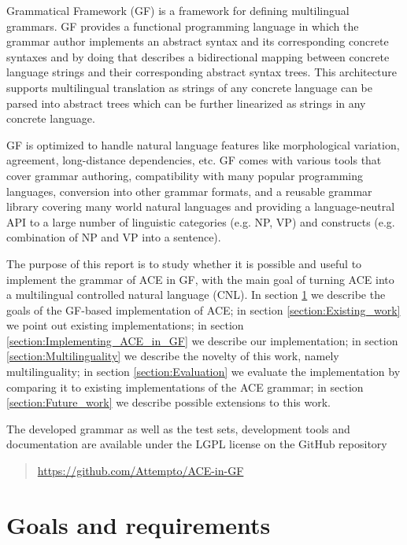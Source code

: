 \documentclass[a4paper]{article}
\begin{document}
Grammatical Framework (GF) \cite{ranta:book2011}
is a framework for defining multilingual grammars.
GF provides a functional programming language in which
the grammar author implements an abstract syntax and its corresponding
concrete syntaxes and by doing that
describes a bidirectional mapping between concrete language strings and
their corresponding abstract syntax trees. This architecture supports
multilingual translation as strings of any concrete language can be parsed into
abstract trees which can be further linearized as strings in any concrete
language.

GF is optimized to handle natural language features like morphological
variation, agreement, long-distance dependencies, etc.
GF comes with various tools that
cover grammar authoring, compatibility with many popular programming languages,
conversion into other grammar formats, and a reusable grammar library covering
many world natural languages and providing a language-neutral API to a large
number of linguistic categories (e.g. NP, VP) and constructs
(e.g. combination of NP and VP into a sentence).

The purpose of this report is to study whether it is possible and useful to
implement the grammar of ACE in GF, with the main goal of turning ACE into
a multilingual controlled natural language (CNL).
In section \ref{section:Goals_and_requirements} we describe the goals of the
GF-based implementation of ACE;
in section \ref{section:Existing_work} we point out existing implementations;
in section \ref{section:Implementing_ACE_in_GF} we describe our implementation;
in section \ref{section:Multilinguality} we describe the novelty of this work,
namely multilinguality;
in section \ref{section:Evaluation} we evaluate the implementation by comparing
it to existing implementations of the ACE grammar;
in section \ref{section:Future_work} we describe possible extensions to this
work.

The developed grammar as well as the test sets, development tools and
documentation are available under the LGPL license on the GitHub repository

\begin{quote}
\url{https://github.com/Attempto/ACE-in-GF}
\end{quote}

\section{Goals and requirements}
\label{section:Goals_and_requirements}
\end{document}
